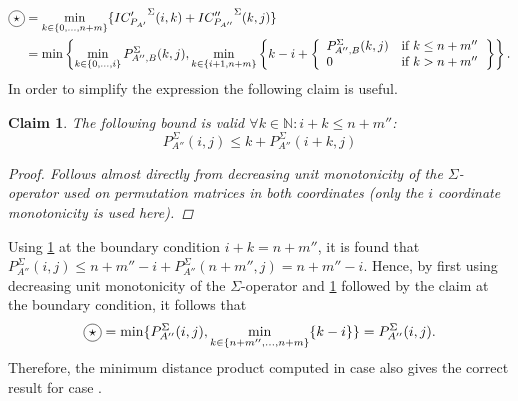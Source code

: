 \documentclass[twoside,11pt,openright]{report}
\newcommand*{\circled}[1]{\tikz[baseline=(char.base)]{
                          \node[shape=circle,draw,inner sep=2pt] (char) {#1};}}
\newtheorem{claim}{Claim}
\begin{document}
\begin{align*}
  \circled{$\star$} &= \min_{k \in \{0,\dots,n+m\}} \{ {IC'_{P_{A'}}}^{\Sigma}(i, k) + {IC''_{P_{A''}}}^{\Sigma}(k, j) \} \\
  &= \min\left\{
       \min_{k \in \{0,\dots,i\}}{P_{A'',B}^{\Sigma}(k, j)},
       \min_{k \in \{i + 1, n + m\}}\left\{ k - i + \left\{ %
        \begin{array}{ll}
          P_{A'',B}^{\Sigma}(k, j) & \text{if } k \leq n + m'' \\
          0                        & \text{if } k > n + m''
        \end{array}
       \right. \right\}
     \right\}.
\end{align*}
%
In order to simplify the expression the following claim is useful.
%
\begin{claim}
  \label{claim:bounding-sigma}
  The following bound is valid $\forall k \in \mathbb{N}: i + k \leq n + m''$:
  \[
    P_{A''}^{\Sigma}(i, j) \leq k + P_{A''}^{\Sigma}(i + k, j)
  \]
  \begin{proof}
    Follows almost directly from decreasing unit monotonicity of the $\Sigma$-operator used on permutation matrices in both coordinates (only the $i$ coordinate monotonicity is used here).
  \end{proof}
\end{claim}
Using \cref{claim:bounding-sigma} at the boundary condition $i + k = n + m''$, it is found that $P_{A''}^{\Sigma}(i, j) \leq n + m'' - i + P_{A''}^{\Sigma}(n + m'', j) = n + m'' - i$. Hence, by first using decreasing unit monotonicity of the $\Sigma$-operator and \cref{claim:bounding-sigma} followed by the claim at the boundary condition, it follows that
\[
  \circled{$\star$} = \min\{ P_{A''}^{\Sigma}(i, j), \min_{k \in \{n+m'', \dots, n+m\}} \{ k - i \} \}
                    = P_{A''}^{\Sigma}(i, j) .
\]
Therefore, the minimum distance product computed in case \circled{3} also gives the correct result for case \circled{1}.
\end{document}
